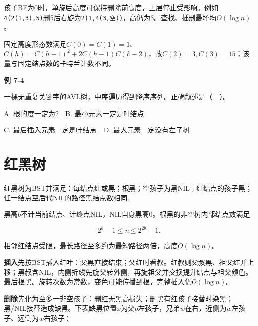 孩子BF为0时，单旋后高度可保持删除前高度，上层停止受影响。例如\texttt{4(\allowbreak{}2(\allowbreak{}1,\allowbreak{}3)\allowbreak{},\allowbreak{}5)\allowbreak{}}删5后右旋为\texttt{2(\allowbreak{}1,\allowbreak{}4(\allowbreak{}3,\allowbreak{}空)\allowbreak{})\allowbreak{}}，高仍为3。查找、插删最坏均\(O(\log n)\)。

固定高度形态数满足\(C(0)=C(1)=1\)、\(C(h)=C(h-1)^2+2C(h-1)C(h-2)\)，故\(C(2)=3,C(3)=15\)；该量与固定结点数的卡特兰计数不同。

\par\medskip{}\noindent\hypertarget{DS07-E04}{}\label{DS07-E04}\textbf{例 7-4}\par\nobreak\smallskip

一棵无重复关键字的AVL树，中序遍历得到降序序列。正确叙述是（　）。

A. 根的度一定为2　B. 最小元素一定是叶结点

C. 最后插入元素一定是叶结点　D. 最大元素一定没有左子树

\section{红黑树}\label{DS07-redblack}

红黑树为BST并满足：每结点红或黑；根黑；空孩子为黑NIL；红结点的孩子黑；任一结点至后代NIL的路径黑结点数相同。

黑高\(b\)不计当前结点、计终点NIL，NIL自身黑高0。根黑的非空树内部结点数满足

\[2^b-1\le n\le2^{2b}-1.\]

相邻红结点受限，最长路径至多约为最短路径两倍，高度\(O(\log n)\)。

\textbf{插入}先按BST插入红叶：父黑直接结束；父红时看叔。红叔则父叔黑、祖父红并上移；黑叔含NIL，内侧折线先旋父转外侧，再旋祖父并交换提升结点与祖父颜色。最后根黑。旋转次数为常数，变色可能传播到根，完整插入仍\(O(\log n)\)。

\textbf{删除}先化为至多一非空孩子：删红无黑高损失；删黑有红孩子接替时染黑；黑/NIL接替造成缺黑。下表缺黑位置\(x\)为父\(p\)左孩子，兄弟\(w\)在右，近侧为\(w\)左孩子、远侧为\(w\)右孩子：

